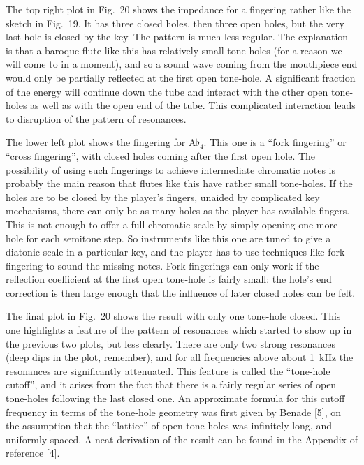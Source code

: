   The top right plot in Fig.\ 20 shows the impedance for a fingering rather 
  like the sketch in Fig.\ 19. It has three closed holes, then three open 
  holes, but the very last hole is closed by the key. The pattern is much less 
  regular. The explanation is that a baroque flute like this has relatively 
  small tone-holes (for a reason we will come to in a moment), and so a sound 
  wave coming from the mouthpiece end would only be partially reflected at the 
  first open tone-hole. A significant fraction of the energy will continue down 
  the tube and interact with the other open tone-holes as well as with the open 
  end of the tube. This complicated interaction leads to disruption of the 
  pattern of resonances. 


  The lower left plot shows the fingering for $\mathrm{A}\flat_4$. This one is 
  a “fork fingering” or “cross fingering”, with closed holes coming after the 
  first open hole. The possibility of using such fingerings to achieve 
  intermediate chromatic notes is probably the main reason that flutes like 
  this have rather small tone-holes. If the holes are to be closed by the 
  player’s fingers, unaided by complicated key mechanisms, there can only be as 
  many holes as the player has available fingers. This is not enough to offer a 
  full chromatic scale by simply opening one more hole for each semitone step. 
  So instruments like this one are tuned to give a diatonic scale in a 
  particular key, and the player has to use techniques like fork fingering to 
  sound the missing notes. Fork fingerings can only work if the reflection 
  coefficient at the first open tone-hole is fairly small: the hole's end 
  correction is then large enough that the influence of later closed holes can 
  be felt. 

  The final plot in Fig.\ 20 shows the result with only one tone-hole closed. 
  This one highlights a feature of the pattern of resonances which started to 
  show up in the previous two plots, but less clearly. There are only two 
  strong resonances (deep dips in the plot, remember), and for all frequencies 
  above about 1~kHz the resonances are significantly attenuated. This feature 
  is called the “tone-hole cutoff”, and it arises from the fact that there is a 
  fairly regular series of open tone-holes following the last closed one. An 
  approximate formula for this cutoff frequency in terms of the tone-hole 
  geometry was first given by Benade [5], on the assumption that the “lattice” 
  of open tone-holes was infinitely long, and uniformly spaced. A neat 
  derivation of the result can be found in the Appendix of reference [4]. 

